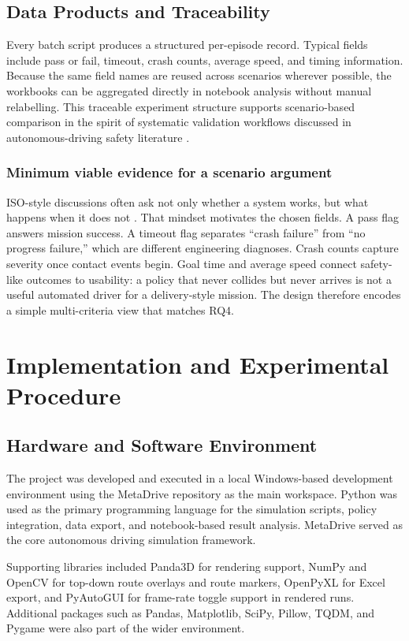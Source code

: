 \documentclass[12pt,a4paper]{report}
\begin{document}
\section{Data Products and Traceability}
Every batch script produces a structured per-episode record. Typical fields include pass or fail, timeout, crash counts, average speed, and timing information. Because the same field names are reused across scenarios wherever possible, the workbooks can be aggregated directly in notebook analysis without manual relabelling. This traceable experiment structure supports scenario-based comparison in the spirit of systematic validation workflows discussed in autonomous-driving safety literature \cite{pegasus_method,iso26262,iso21448}.

\subsection{Minimum viable evidence for a scenario argument}
ISO-style discussions often ask not only whether a system works, but what happens when it does not \cite{iso26262,iso21448}. That mindset motivates the chosen fields. A pass flag answers mission success. A timeout flag separates ``crash failure'' from ``no progress failure,'' which are different engineering diagnoses. Crash counts capture severity once contact events begin. Goal time and average speed connect safety-like outcomes to usability: a policy that never collides but never arrives is not a useful automated driver for a delivery-style mission. The design therefore encodes a simple multi-criteria view that matches RQ4.

\chapter{Implementation and Experimental Procedure}

\section{Hardware and Software Environment}
The project was developed and executed in a local Windows-based development environment using the MetaDrive repository as the main workspace. Python was used as the primary programming language for the simulation scripts, policy integration, data export, and notebook-based result analysis. MetaDrive served as the core autonomous driving simulation framework.

Supporting libraries included Panda3D for rendering support, NumPy and OpenCV for top-down route overlays and route markers, OpenPyXL for Excel export, and PyAutoGUI for frame-rate toggle support in rendered runs. Additional packages such as Pandas, Matplotlib, SciPy, Pillow, TQDM, and Pygame were also part of the wider environment.
\end{document}
